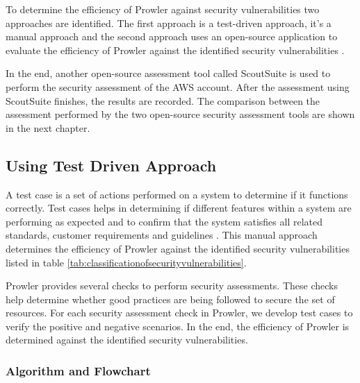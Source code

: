 \par To determine the efficiency of Prowler against security vulnerabilities two approaches are identified.
The first approach is a test-driven approach, it’s a
manual approach and the second approach uses an open-source application to evaluate the efficiency of Prowler against the identified security vulnerabilities \cite{47}.

\par In the end, another open-source assessment tool called ScoutSuite is used to perform the security assessment of the AWS account.
After the assessment using ScoutSuite finishes, the results are recorded.
The comparison between the assessment performed by the two open-source security
assessment tools are shown in the next chapter.

\subsection{Using Test Driven Approach}

\par A test case is a set of actions performed on a system to determine if it functions correctly. Test cases helps
in determining if different features within a system are performing as expected and to confirm that the system
satisfies all related standards, customer requirements and guidelines \cite{75}. This manual approach determines the
efficiency of Prowler against the identified security vulnerabilities listed in table \ref{tab:classificationofsecurityvulnerabilities}.

\par Prowler provides several checks to perform security assessments.
These checks help determine whether good practices are being followed to secure the set of resources. For each security assessment check in Prowler, we develop test cases to verify the positive and negative scenarios. In the end, the efficiency of Prowler is determined against the identified security vulnerabilities.

\subsubsection{Algorithm and Flowchart}

